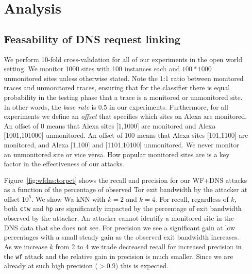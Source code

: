 \section{Analysis}
\label{sec:analysis}

\subsection{Feasability of DNS request linking}

We perform 10-fold cross-validation for all of our experiments in the open
world setting. We monitor 1000 sites with 100 instances each and
$100*1000$ unmonitored sites unless otherwise stated.
Note the 1:1 ratio between monitored traces and unmonitored traces,
ensuring that for the classifier there is equal probability in the testing
phase that a trace is a monitored or unmonitored site.
In other words, the \emph{base rate} is 0.5 in our experiments.
Furthermore, for all experiments we define an \emph{offset} that specifies
which sites on Alexa are monitored. An offset of 0 means that Alexa sites
[1,1000] are monitored and Alexa [1001,101000] unmonitored. An offset of 100
means that Alexa sites [101,1100] are monitored, and Alexa [1,100] and
[1101,10100] unmonitored.
We never monitor an unmonitored site or vice versa. How popular monitored sites
are is a key factor in the effectiveness of our attacks.

Figure~\ref{fig:wfdns:torpct} shows the recall and precision for our WF+DNS
attacks as a function of the percentage of observed Tor exit bandwidth by the
attacker at offset $10^5$. We show Wa-kNN with $k=2$ and $k=4$.
For recall, regardless of $k$, both \texttt{ctw} and \texttt{hp} are
significantly impacted by the percentage of exit bandwidth observed by the
attacker. An attacker cannot identify a monitored site in the DNS data that
she does not see.
For precision we see a significant gain at low percentages with a small steady
gain as the observed exit bandwidth increases. As we increase $k$ from 2 to 4
we trade decreased recall for increased precision in the \texttt{wf} attack
and the relative gain in precision is much smaller. Since we are already at
such high precision ($>0.9$) this is expected.

